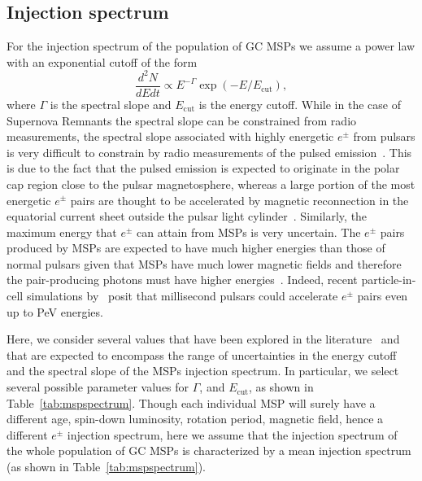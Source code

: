 \documentclass[doublespace,draft,nopageskip]{VTthesis} %
\begin{document}
\subsection{Injection spectrum}\label{subsec:spectrum}

For the injection spectrum of the population of GC MSPs we 
assume a power law with an exponential cutoff of the form 
\begin{equation}
  \label{eq:mspspectrum}
  \dfrac{d^2N}{dEdt} \propto E^{-\Gamma}\exp(-E/E_{\text{cut}}),
\end{equation}
where $\Gamma$ is the spectral slope and $E_{\text{cut}}$ is the energy cutoff. While in the case of Supernova Remnants the spectral slope can be constrained from radio measurements, the spectral slope associated with highly energetic $e^\pm$ from pulsars is very difficult to constrain by radio measurements of the pulsed emission~\citep{Delahaye:2010}. This is due to the fact that the pulsed emission is expected to originate in the polar cap region close to the pulsar magnetosphere, whereas a large portion of the most energetic $e^\pm$ pairs are thought to be accelerated by magnetic reconnection in the equatorial current sheet outside the pulsar light cylinder~\citep{Cerutti:2015hvk}. Similarly, the maximum energy that $e^{\pm}$ can attain from MSPs is very uncertain. The $e^\pm$ pairs produced by MSPs are expected to have much higher energies than those of normal pulsars given that MSPs have much lower magnetic fields and therefore the pair-producing photons must have higher energies~\citep{Harding:2021yuv}. Indeed, recent particle-in-cell simulations by~\citep{Guepin:2019fjb} posit that millisecond pulsars could accelerate $e^\pm$ pairs even up to PeV energies.

 Here, we consider several values that have been explored in the literature~\citep[e.g.,][]{Yuan:2014yda,Song:2019nrx,Guepin:2019fjb} and that are expected to encompass the range of uncertainties in the energy cutoff and the spectral slope of the MSPs injection spectrum. In particular, we select several possible parameter values for $\Gamma$, and $E_{\text{cut}}$, as shown in Table~\ref{tab:mspspectrum}. 
 Though each individual MSP will surely have a different age, spin-down luminosity, rotation period, magnetic field, hence a different $e^\pm$ injection spectrum, here we assume that the injection spectrum of the whole population of GC MSPs is characterized by a mean injection spectrum (as shown in Table~\ref{tab:mspspectrum}).
 
\end{document}

